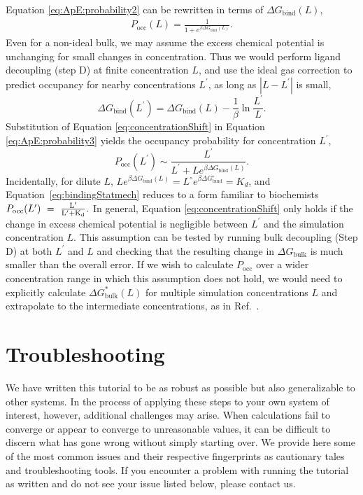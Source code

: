\documentclass[9pt,tutorial]{Styling/livecoms}
\begin{document}
Equation \ref{eq:ApE:probability2} can be rewritten in terms of $\Delta G_\mathrm{bind}(L)$,  
\begin{align}
 P_\mathrm{occ}(L) = \frac{1}{1+e^{\beta \Delta G_\mathrm{bind}(L)}} \label{eq:ApE:probability3}.
\end{align}
Even for a non-ideal bulk, we may assume the excess chemical potential is unchanging for small changes in concentration. Thus we would perform ligand decoupling (step D) at finite concentration $L$, and use the ideal gas correction to predict occupancy for nearby concentrations $L^\prime$, as long as $|L-L^\prime|$ is small,
\begin{equation}
\label{eq:concentrationShift}
    \Delta G_\mathrm{bind}(L^\prime)= \Delta G_\mathrm{bind}(L)-\frac{1}{\beta} \ln \frac{L^\prime}{L}.
\end{equation}
Substitution of Equation \ref{eq:concentrationShift} in Equation \ref{eq:ApE:probability3} yields the occupancy probability for concentration $L^\prime$,
\begin{equation}\label{eq:bindingStatmech}
    P_\mathrm{occ}(L^\prime)\sim\frac{L^\prime}{L^\prime+{L}e^{\beta \Delta G_\mathrm{bind}(L)}}.
    \end{equation} 
Incidentally, for dilute $L$, ${L}e^{\beta \Delta G_\mathrm{bind}(L)}={L^\circ}e^{\beta \Delta G^\circ_\mathrm{bind}}=K_d$,
and Equation~\ref{eq:bindingStatmech} reduces to  a form familiar to biochemists 
$
    P_\mathrm{occ}(L^\prime)~=~\rm\frac{L^\prime}{L^\prime+K_d}.
$
In general, Equation \ref{eq:concentrationShift} only holds if the change in excess chemical potential is negligible between $L^\prime$ and the simulation concentration $L$.
This assumption can be tested by running bulk decoupling (Step D) at both $L^\prime$ and $L$ and checking that the resulting change in $\Delta G_\mathrm{bulk}$ is much smaller than the overall error. If we wish to calculate $P_\mathrm{occ}$ over a wider concentration range in which this assumption does not hold, we would need to explicitly calculate $\Delta G^*_\mathrm{bulk}(L)$ for multiple simulation concentrations $L$ and extrapolate to the intermediate concentrations, as in Ref.~.


\section{Troubleshooting}
\label{app:troubleshooting}
We have written this tutorial to be as robust as possible but also generalizable to other systems.
In the process of applying these steps to your own system of interest, however, additional challenges may arise.
When calculations fail to converge or appear to converge to unreasonable values, it can be difficult to discern what has gone wrong without simply starting over. 
We provide here some of the most common issues and their respective fingerprints as cautionary tales and troubleshooting tools.
If you encounter a problem with running the tutorial as written and do not see your issue listed below, please contact us.
\end{document}
